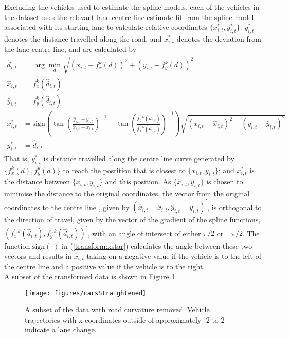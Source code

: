 \documentclass[
12pt, %
onehalfspacing, %
nohyperref, %
headsepline, %
chapterinoneline, %
]{MastersDoctoralThesis} %
\begin{document}
Excluding the vehicles used to estimate the spline models, each of the vehicles in the dataset uses the relevant lane centre line estimate fit from the spline model associated with its starting lane to calculate relative coordinates $\{x^*_{i, t}, y^*_{i, t}\}$. 
$y^*_{i, t}$ denotes the distance travelled along the road, and $x^*_{i, t}$ denotes the deviation from the lane centre line, and are calculated by
\begin{align}
\hat{d}_{i, t} &= \arg \underset{d}{\min} \sqrt{(x_{i, t} - f_x^k(d))^2 + (y_{i, t} - f_y^k(d))^2}\\
\hat{x}_{i, t} &= f_x^k(\hat{d}_{i, t}) \\
\hat{y}_{i, t} &= f_y^k(\hat{d}_{i, t}) \\
x^*_{i, t} &= \mbox{sign}\left(\tan\left(\frac{\hat{y}_{i, t} - y_{i, t}}{\hat{x}_{i, t} - x_{i, t}} \right)^{-1} - \tan \left(\frac{f_y^{\prime, k}(\hat{d}_{i, t})}{f_x^{\prime, k}(\hat{d}_{i, t})}\right)^{-1} \right) \sqrt{(x_{i, t} - \hat{x}_{i, t})^2 + (y_{i, t} - \hat{y}_{i, t})^2} \label{transform:xstar} \\
y^*_{i, t} &= \hat{d}_{i, t}
\end{align}
That is, $y^*_{i, t}$ is distance travelled along the centre line curve generated by $\{f_x^k(d), f_y^k(d)\}$ to reach the postition that is closest to $\{x_{i, t}, y_{i, t}\}$; and $x^*_{i, t}$ is the distance between $\{x_{i, t}, y_{i, t}\}$ and this position. As $\{\hat{x}_{i, t}, \hat{y}_{i, t}\}$ is chosen to minimise the distance to the original coordinates, the vector from the original coordinates to the centre line , given by $(\hat{x}_{i, t} - x_{i, t}, \hat{y}_{i, t} - y_{i, t})^{\prime}$, is orthogonal to the direction of travel, given by the vector of the gradient of the spline functions, $(f_x^{\prime, k}(\hat{d}_{i, t}), f_y^{\prime, k}(\hat{d}_{i, t}))^{\prime}$, with an angle of intersect of either $\pi/2$ or $-\pi/2$. The function $\mbox{sign}(\cdot)$ in (\ref{transform:xstar}) calculates the angle between these two vectors and results in $\hat{x}_{i, t}$ taking on a negative value if the vehicle is to the left of the centre line and a positive value if the vehicle is to the right.
\\

A subset of the transformed data is shown in Figure \ref{fig:straight}.
\begin{figure}[htbp]
\centering
\texttt{[image: figures/carsStraightened]}
\caption{A subset of the data with road curvature removed.  Vehicle trajectories with x coordinates outside of approximately -2 to 2 indicate a lane change.}
\label{fig:straight}
\end{figure}
\end{document}
